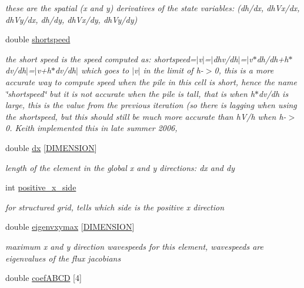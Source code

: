 \begin{CompactItemize}
\begin{CompactList}\small\item\em these are the spatial (x and y) derivatives of the state variables: (dh/dx, dh\-Vx/dx, dh\-Vy/dx, dh/dy, dh\-Vx/dy, dh\-Vy/dy) \item\end{CompactList}\item 
double \hyperlink{classElement_r31}{shortspeed}
\begin{CompactList}\small\item\em the short speed is the speed computed as: shortspeed=$|$v$|$=$|$dhv/dh$|$=$|$v$\ast$dh/dh+h$\ast$dv/dh$|$=$|$v+h$\ast$dv/dh$|$ which goes to $|$v$|$ in the limit of h-$>$0, this is a more accurate way to compute speed when the pile in this cell is short, hence the name \char`\"{}shortspeed\char`\"{} but it is not accurate when the pile is tall, that is when h$\ast$dv/dh is large, this is the value from the previous iteration (so there is lagging when using the shortspeed, but this should still be much more accurate than h\-V/h when h-$>$0. Keith implemented this in late summer 2006, \item\end{CompactList}\item 
double \hyperlink{classElement_r32}{dx} \mbox{[}\hyperlink{constant_8h_a15}{DIMENSION}\mbox{]}
\begin{CompactList}\small\item\em length of the element in the global x and y directions: dx and dy \item\end{CompactList}\item 
int \hyperlink{classElement_r33}{positive\_\-x\_\-side}
\begin{CompactList}\small\item\em for structured grid, tells which side is the positive x direction \item\end{CompactList}\item 
double \hyperlink{classElement_r34}{eigenvxymax} \mbox{[}\hyperlink{constant_8h_a15}{DIMENSION}\mbox{]}
\begin{CompactList}\small\item\em maximum x and y direction wavespeeds for this element, wavespeeds are eigenvalues of the flux jacobians \item\end{CompactList}\item 
double \hyperlink{classElement_r35}{coef\-ABCD} \mbox{[}4\mbox{]}

\end{CompactItemize}
